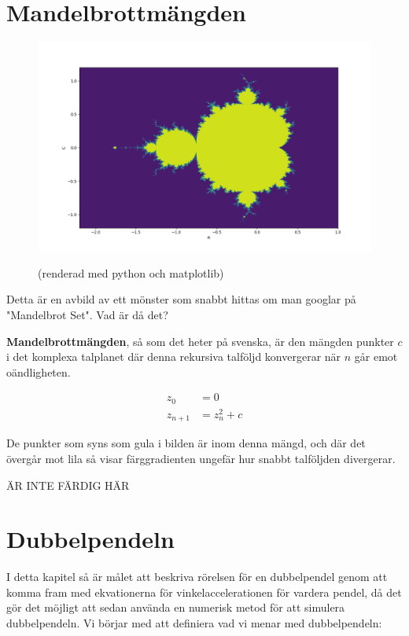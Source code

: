 \documentclass[10pt, a4paper]{amsart}
\begin{document}
\section{Mandelbrottmängden}
\begin{figure}[H]
    \includegraphics[width=\linewidth]{photos/chapter4/1.png}
    \centerline{(renderad med python och matplotlib)}
\end{figure}
\bigskip

Detta är en avbild av ett mönster som snabbt hittas om man googlar på "Mandelbrot Set".
Vad är då det? \bigskip 

\textbf{Mandelbrottmängden}, så som det heter på svenska, 
är den mängden punkter $ c $ i det komplexa talplanet där denna rekursiva talföljd konvergerar när $ n $ går emot oändligheten.

\begin{align*}
    z_0 &= 0\\
    z_{n+1} &= z_n^2 + c
\end{align*} \bigskip

De punkter som syns som gula i bilden är inom denna mängd, 
och där det övergår mot lila så visar färggradienten ungefär hur snabbt talföljden divergerar. \bigskip 

ÄR INTE FÄRDIG HÄR

\newpage
\section{Dubbelpendeln} 

I detta kapitel så är målet att beskriva rörelsen för en dubbelpendel genom att komma fram med ekvationerna för vinkelaccelerationen för vardera pendel, 
då det gör det möjligt att sedan använda en numerisk metod för att simulera dubbelpendeln. Vi börjar med att definiera vad vi menar med dubbelpendeln: \bigskip 
\end{document}
